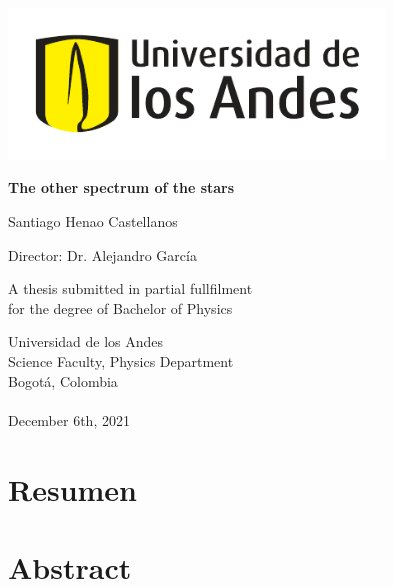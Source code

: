 \documentclass[12pt,letterpaper,oneside]{book}
\begin{document}
	\begin{titlepage}
		\begin{center}
			\includegraphics[width=10cm]{img/logo-uniandes.pdf}
			
			\vspace{2cm}
			
			{\fontsize{25}{40}\selectfont \bf The other spectrum of the stars\par}
			
			\vspace{10mm}
			
			{\huge Santiago Henao Castellanos}
			
			\vspace{10mm}
			
			{\huge Director: Dr. Alejandro García } 
			
			\vspace{15mm}
			
			{\large
				A thesis submitted in partial fullfilment\\
				for the degree of Bachelor of Physics
			}
			
			\vspace{5mm}
			
			{\Large
				Universidad de los Andes\\
				Science Faculty, Physics Department\\
				Bogotá, Colombia\\ \phantom{} \\
				December 6th, 2021
			}
		\end{center}
	\end{titlepage}

\frontmatter

\chapter*{Resumen}

\chapter*{Abstract}
\end{document}
